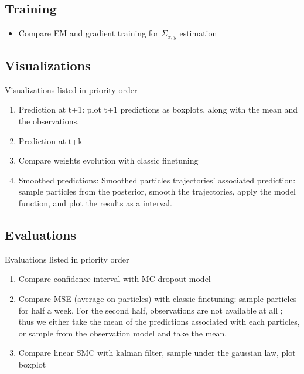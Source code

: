 \documentclass{article}
\begin{document}
\subsection{Training}%
\label{sub:training}

\begin{itemize}
	\item Compare EM and gradient training for $\Sigma_{x, y}$ estimation
\end{itemize}

\subsection{Visualizations}%
\label{sub:visualizations}

Visualizations listed in priority order
\begin{enumerate}
	\item Prediction at t+1: plot t+1 predictions as boxplots, along with the mean and the observations.
	\item Prediction at t+k
	\item Compare weights evolution with classic finetuning
	\item Smoothed predictions: Smoothed particles trajectories' associated prediction: sample particles from the posterior, smooth the trajectories, apply the model function, and plot the results as a interval.
\end{enumerate}

\subsection{Evaluations}%
\label{sub:evaluations}

Evaluations listed in priority order
\begin{enumerate}
	\item Compare confidence interval with MC-dropout model
	\item Compare MSE (average on particles) with classic finetuning: sample particles for half a week. For the second half, observations are not available at all ; thus we either take the mean of the predictions associated with each particles, or sample from the observation model and take the mean.
	\item Compare linear SMC with kalman filter, sample under the gaussian law, plot boxplot
\end{enumerate}


\end{document}
